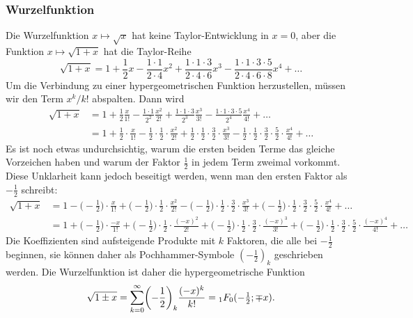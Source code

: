 \subsubsection{Wurzelfunktion}
Die Wurzelfunktion $x\mapsto \sqrt{x}$ hat keine Taylor-Entwicklung
in $x=0$, aber die Funktion $x\mapsto\sqrt{1+x}$ hat die Taylor-Reihe
\[
\sqrt{1+x}
=
1
+
\frac12 x
-
\frac{1\cdot 1}{2\cdot 4}x^2
+
\frac{1\cdot 1\cdot 3}{2\cdot 4\cdot 6}x^3
-
\frac{1\cdot 1\cdot 3\cdot 5}{2\cdot 4\cdot 6\cdot 8}x^4
+
\dots
\]
Um die Verbindung zu einer hypergeometrischen Funktion herzustellen,
müssen wir den Term $x^k/k!$ abspalten.
Dann wird
\begin{align*}
\sqrt{1+x}
&=
1
+
\frac12 \frac{x}{1!}
-
\frac{1\cdot 1}{2^2}\frac{x^2}{2!}
+
\frac{1\cdot 1\cdot 3}{2^3}\frac{x^3}{3!}
-
\frac{1\cdot 1\cdot 3\cdot 5}{2^4}\frac{x^4}{4!}
+
\dots
\\
&=
1
+
\frac12 \cdot\frac{x}{1!}
-
\frac{1}{2}\cdot \frac{1}{2}\cdot\frac{x^2}{2!}
+
\frac{1}{2}\cdot \frac{1}2\cdot \frac{3}{2}\cdot\frac{x^3}{3!}
-
\frac{1}{2}\cdot \frac{1}{2}\cdot \frac{3}{2}\cdot \frac{5}{2}\cdot\frac{x^4}{4!}
+
\dots
\end{align*}
Es ist noch etwas undurchsichtig, warum die ersten beiden Terme
das gleiche Vorzeichen haben und warum der Faktor $\frac12$ in jedem
Term zweimal vorkommt.
Diese Unklarheit kann jedoch beseitigt werden, wenn man den ersten
Faktor als $-\frac12$ schreibt:
\begin{align*}
\sqrt{1+x}
&=
1
-
\biggl(-\frac12\biggr)\cdot\frac{x}{1!}
+
\biggl(-\frac{1}{2}\biggr)\cdot \frac{1}{2}\cdot\frac{x^2}{2!}
-
\biggl(-\frac{1}{2}\biggr)\cdot \frac{1}2\cdot \frac{3}{2}\cdot\frac{x^3}{3!}
+
\biggl(-\frac{1}{2}\biggr)\cdot \frac{1}{2}\cdot \frac{3}{2}\cdot \frac{5}{2}\cdot\frac{x^4}{4!}
+
\dots
\\
&=
1 + 
\biggl(-\frac12\biggr)\cdot\frac{-x}{1!}
+
\biggl(-\frac{1}{2}\biggr)\cdot \frac{1}{2}\cdot\frac{(-x)^2}{2!}
+
\biggl(-\frac{1}{2}\biggr)\cdot \frac{1}2\cdot \frac{3}{2}\cdot\frac{(-x)^3}{3!}
+
\biggl(-\frac{1}{2}\biggr)\cdot \frac{1}{2}\cdot \frac{3}{2}\cdot \frac{5}{2}\cdot\frac{(-x)^4}{4!}
+
\dots
\end{align*}
Die Koeffizienten sind aufsteigende Produkte mit $k$ Faktoren, die alle bei
$-\frac12$ beginnen, sie können daher als Pochhammer-Symbole $(-\frac12)_k$
geschrieben werden.
Die Wurzelfunktion ist daher die hypergeometrische Funktion
\[
\sqrt{1\pm x}
=
\sum_{k=0}^\infty
\biggl(-\frac12\biggr)_k \frac{(-x)^k}{k!}
=
\mathstrut_1F_0(-{\textstyle\frac12};\mp x).
\]

